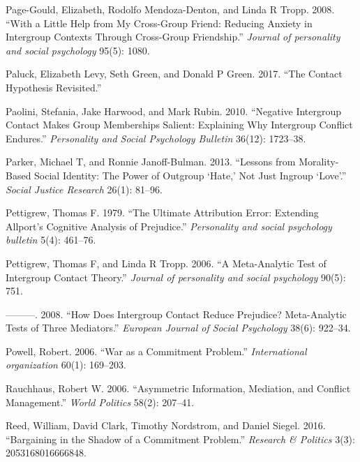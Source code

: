 \documentclass[11pt]{article}
\begin{document}
\leavevmode\hypertarget{ref-page2008little}{}%
Page-Gould, Elizabeth, Rodolfo Mendoza-Denton, and Linda R Tropp. 2008.
``With a Little Help from My Cross-Group Friend: Reducing Anxiety in
Intergroup Contexts Through Cross-Group Friendship.'' \emph{Journal of
personality and social psychology} 95(5): 1080.

\leavevmode\hypertarget{ref-paluck2017contact}{}%
Paluck, Elizabeth Levy, Seth Green, and Donald P Green. 2017. ``The
Contact Hypothesis Revisited.''

\leavevmode\hypertarget{ref-paolini2010negative}{}%
Paolini, Stefania, Jake Harwood, and Mark Rubin. 2010. ``Negative
Intergroup Contact Makes Group Memberships Salient: Explaining Why
Intergroup Conflict Endures.'' \emph{Personality and Social Psychology
Bulletin} 36(12): 1723--38.

\leavevmode\hypertarget{ref-parker2013lessons}{}%
Parker, Michael T, and Ronnie Janoff-Bulman. 2013. ``Lessons from
Morality-Based Social Identity: The Power of Outgroup `Hate,' Not Just
Ingroup `Love'.'' \emph{Social Justice Research} 26(1): 81--96.

\leavevmode\hypertarget{ref-pettigrew1979ultimate}{}%
Pettigrew, Thomas F. 1979. ``The Ultimate Attribution Error: Extending
Allport's Cognitive Analysis of Prejudice.'' \emph{Personality and
social psychology bulletin} 5(4): 461--76.

\leavevmode\hypertarget{ref-pettigrew2006meta}{}%
Pettigrew, Thomas F, and Linda R Tropp. 2006. ``A Meta-Analytic Test of
Intergroup Contact Theory.'' \emph{Journal of personality and social
psychology} 90(5): 751.

\leavevmode\hypertarget{ref-pettigrew2008does}{}%
---------. 2008. ``How Does Intergroup Contact Reduce Prejudice?
Meta-Analytic Tests of Three Mediators.'' \emph{European Journal of
Social Psychology} 38(6): 922--34.

\leavevmode\hypertarget{ref-powell2006war}{}%
Powell, Robert. 2006. ``War as a Commitment Problem.''
\emph{International organization} 60(1): 169--203.

\leavevmode\hypertarget{ref-rauchhaus2006mediation}{}%
Rauchhaus, Robert W. 2006. ``Asymmetric Information, Mediation, and
Conflict Management.'' \emph{World Politics} 58(2): 207--41.

\leavevmode\hypertarget{ref-reed2016bargaining}{}%
Reed, William, David Clark, Timothy Nordstrom, and Daniel Siegel. 2016.
``Bargaining in the Shadow of a Commitment Problem.'' \emph{Research \&
Politics} 3(3): 2053168016666848.
\end{document}
